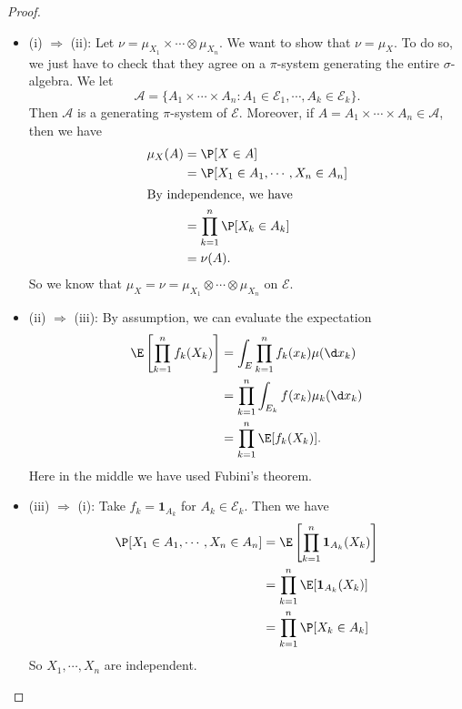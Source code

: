 \documentclass[a4paper]{article}
\begin{document}
\begin{proof}\leavevmode
  \begin{itemize}
    \item (i) $\Rightarrow$ (ii): Let $\nu = \mu_{X_1} \times \cdots \otimes \mu_{X_n}$. We want to show that $\nu = \mu_X$. To do so, we just have to check that they agree on a $\pi$-system generating the entire $\sigma$-algebra. We let
      \[
        \mathcal{A} = \{A_1 \times \cdots \times A_n: A_1 \in \mathcal{E}_1, \cdots, A_k \in \mathcal{E}_k\}.
      \]
      Then $\mathcal{A}$ is a generating $\pi$-system of $\mathcal{E}$. Moreover, if $A = A_1 \times \cdots \times A_n \in \mathcal{A}$, then we have
      \begin{align*}
        \mu_X(A) &= \P[X \in A] \\
        &= \P[X_1 \in A_1, \cdots, X_n \in A_n]\\
        \intertext{By independence, we have}
        &= \prod_{k = 1}^n \P[X_k \in A_k]\\
        &= \nu(A).
      \end{align*}
      So we know that $\mu_X = \nu = \mu_{X_1} \otimes \cdots \otimes \mu_{X_n}$ on $\mathcal{E}$.
    \item (ii) $\Rightarrow$ (iii): By assumption, we can evaluate the expectation
      \begin{align*}
        \E\left[\prod_{k = 1}^n f_k(X_k)\right] &= \int_E \prod_{k = 1}^n f_k(x_k) \mu(\d x_k)\\
        &= \prod_{k = 1}^n \int_{E_k} f(x_k) \mu_k(\d x_k)\\
        &= \prod_{k = 1}^n \E[f_k(X_k)].
      \end{align*}
      Here in the middle we have used Fubini's theorem.
    \item (iii) $\Rightarrow$ (i): Take $f_k = \mathbf{1}_{A_k}$ for $A_k \in \mathcal{E}_k$. Then we have
      \begin{align*}
        \P[X_1 \in A_1, \cdots, X_n \in A_n] &= \E\left[\prod_{k = 1}^n \mathbf{1}_{A_k}(X_k)\right] \\
        &= \prod_{k = 1}^n \E[\mathbf{1}_{A_k}(X_k)]\\
        &= \prod_{k = 1}^n \P[X_k \in A_k]
      \end{align*}
      So $X_1, \cdots, X_n$ are independent.
  \end{itemize}
\end{proof}
\end{document}
